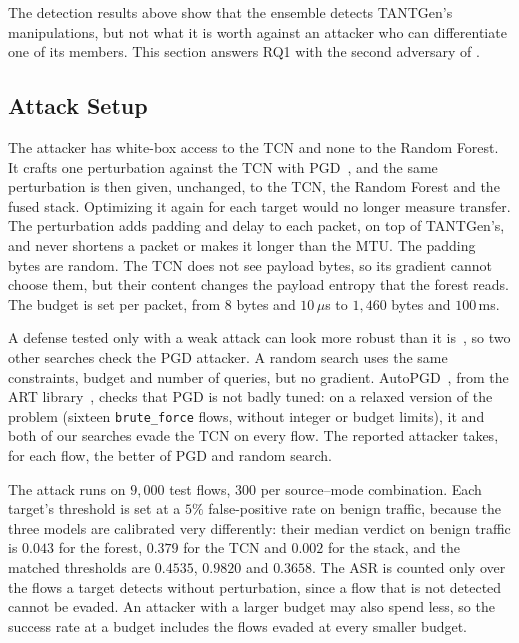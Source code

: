 The detection results above show that the ensemble detects TANTGen's manipulations,
but not what it is worth against an attacker who can differentiate one of its members.
This section answers RQ1 with the second adversary of .

\subsection{Attack Setup}\label{subsec:eval-gradablation-setup}

The attacker has white-box access to the \ac{TCN} and none to the Random Forest. It
crafts one perturbation against the \ac{TCN} with \ac{PGD}~\cite{madry2018towards}, and
the same perturbation is then given, unchanged, to the \ac{TCN}, the Random Forest and
the fused stack. Optimizing it again for each target would no longer measure transfer.
The perturbation adds padding and delay to each packet, on top of TANTGen's, and never
shortens a packet or makes it longer than the \ac{MTU}. The padding bytes are random.
The \ac{TCN} does not see payload bytes, so its gradient cannot choose them, but their
content changes the payload entropy that the forest reads. The budget is set per packet,
from $8$ bytes and $10\,\mu$s to $1{,}460$ bytes and $100$\,ms.

A defense tested only with a weak attack can look more robust than it
is~\cite{carlini2019evaluating,tramer2020adaptive}, so two other searches check the
\ac{PGD} attacker. A random search uses the same constraints, budget and number of
queries, but no gradient. AutoPGD~\cite{croce2020reliable}, from the \ac{ART}
library~\cite{nicolae2018adversarial}, checks that \ac{PGD} is not badly tuned: on a
relaxed version of the problem (sixteen \texttt{brute\_force} flows, without integer or
budget limits), it and both of our searches evade the \ac{TCN} on every flow. The
reported attacker takes, for each flow, the better of \ac{PGD} and random search.

The attack runs on $9{,}000$ test flows, $300$ per source--mode combination. Each
target's threshold is set at a $5\%$ false-positive rate on benign traffic, because the
three models are calibrated very differently: their median verdict on benign traffic is
$0.043$ for the forest, $0.379$ for the \ac{TCN} and $0.002$ for the stack, and the
matched thresholds are $0.4535$, $0.9820$ and $0.3658$. The \ac{ASR} is counted only over
the flows a target detects without perturbation, since a flow that is not detected cannot
be evaded. An attacker with a larger budget may also spend less, so the success rate at a
budget includes the flows evaded at every smaller budget.


